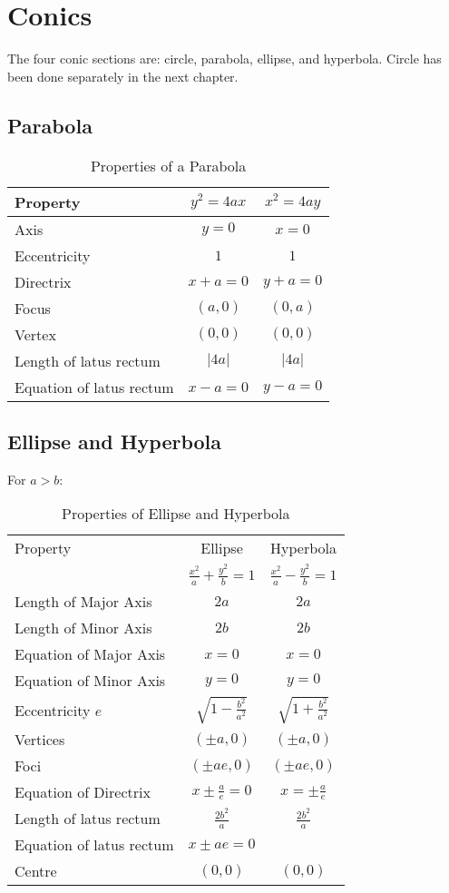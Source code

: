 \large{\chapter{Conics}}
The four conic sections are: circle, parabola, ellipse, and hyperbola. Circle has been done separately in the next chapter.

\section{Parabola}
\begin{table}[htbp]
	\centering
	\begin{tabular}{l c c}
		\toprule
		Property & $y^2=4ax$ & $x^2=4ay$\\
		\midrule

		Axis & $y=0$ & $x=0$\\
		Eccentricity & $1$ & $1$\\
		Directrix & $x+a=0$ & $y+a=0$\\
		Focus & $(a,0)$ & $(0,a)$\\
		Vertex & $(0,0)$ & $(0,0)$\\
		Length of latus rectum & $\lvert 4a \rvert$ & $\lvert 4a \rvert$\\
		Equation of latus rectum & $x-a=0$ & $y-a=0$\\
		\bottomrule
	\end{tabular}
	\caption{Properties of a Parabola}
	\label{parabola}
\end{table}

\section{Ellipse and Hyperbola}
For $a>b$:
\begin{table}[htbp]
	\centering
	\renewcommand{\arraystretch}{1.2}
	\begin{tabular}{l c c}
		\toprule
		Property & Ellipse & Hyperbola\\
		 & $\frac{x^2}{a}+\frac{y^2}{b}=1$ & $\frac{x^2}{a}-\frac{y^2}{b}=1$\\
		\midrule
		Length of Major Axis & $2a$ & $2a$\\
		Length of Minor Axis & $2b$ & $2b$\\
		Equation of Major Axis & $x=0$ & $x=0$\\
		Equation of Minor Axis & $y=0$ & $y=0$\\
		Eccentricity $e$ & $\sqrt{1-\frac{b^2}{a^2}}$ & $\sqrt{1+\frac{b^2}{a^2}}$\\
		Vertices & $(\pm a,0)$ & $(\pm a,0)$\\
		Foci & $(\pm ae,0)$ & $(\pm ae,0)$\\
		Equation of Directrix & $x \pm \frac{a}{e}=0$ & $x=\pm\frac{a}{e}$\\
		Length of latus rectum & $\frac{2b^2}{a}$ & $\frac{2b^2}{a}$\\
		Equation of latus rectum & $x \pm ae=0$ & \\
		Centre & $(0,0)$ & $(0,0)$\\
		\bottomrule
	\end{tabular}
	\caption{Properties of Ellipse and Hyperbola}
	\label{ell & hyp}
\end{table}

